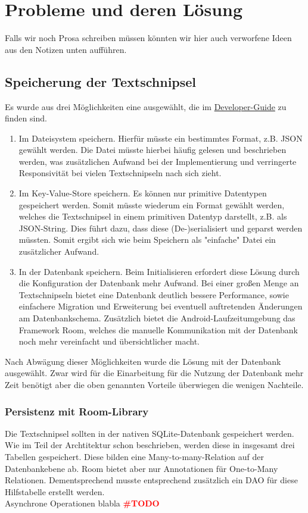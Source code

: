 \documentclass[11pt]{article}
\begin{document}
	
\section{Probleme und deren Lösung}
	Falls wir noch Prosa schreiben müssen könnten wir hier auch verworfene Ideen aus den Notizen unten aufführen.
	\subsection{Speicherung der Textschnipsel}
		Es wurde aus drei Möglichkeiten eine ausgewählt, die im \href{https://developer.android.com/guide/topics/data/data-storage}{Developer-Guide} zu finden sind.
		\begin{enumerate}
			\item Im Dateisystem speichern. Hierfür müsste ein bestimmtes Format, z.B. JSON gewählt werden. Die Datei müsste hierbei häufig gelesen und beschrieben werden, was zusätzlichen Aufwand bei der Implementierung und verringerte Responsivität bei vielen Textschnipseln nach sich zieht.
			\item Im Key-Value-Store speichern. Es können nur primitive Datentypen gespeichert werden. Somit müsste wiederum ein Format gewählt werden, welches die Textschnipsel in einem primitiven Datentyp darstellt, z.B. als JSON-String. Dies führt dazu, dass diese (De-)serialisiert und geparst werden müssten. Somit ergibt sich wie beim Speichern als "einfache" Datei ein zusätzlicher Aufwand.
			\item In der Datenbank speichern. Beim Initialisieren erfordert diese Lösung durch die Konfiguration der Datenbank mehr Aufwand. Bei einer großen Menge an Textschnipseln bietet eine Datenbank deutlich bessere Performance, sowie einfachere Migration und Erweiterung bei eventuell auftretenden Änderungen am Datenbankschema. Zusätzlich bietet die Android-Laufzeitumgebung das Framework Room, welches die manuelle Kommunikation mit der Datenbank noch mehr vereinfacht und übersichtlicher macht.
		\end{enumerate}
		Nach Abwägung dieser Möglichkeiten wurde die Lösung mit der Datenbank ausgewählt. Zwar wird für die Einarbeitung für die Nutzung der Datenbank mehr Zeit benötigt aber die oben genannten Vorteile überwiegen die wenigen Nachteile.
	
		\subsubsection{Persistenz mit Room-Library}
			Die Textschnipsel sollten in der nativen SQLite-Datenbank gespeichert werden. Wie im Teil der Archtitektur schon beschrieben, werden diese in insgesamt drei Tabellen gespeichert. Diese bilden eine Many-to-many-Relation auf der Datenbankebene ab. Room bietet aber nur Annotationen für One-to-Many Relationen. Dementsprechend musste entsprechend zusätzlich ein DAO für diese Hilfstabelle erstellt werden. \\
			Asynchrone Operationen blabla \textcolor{red}{\textbf{{\LARGE \#TODO}}}
			
\end{document}
